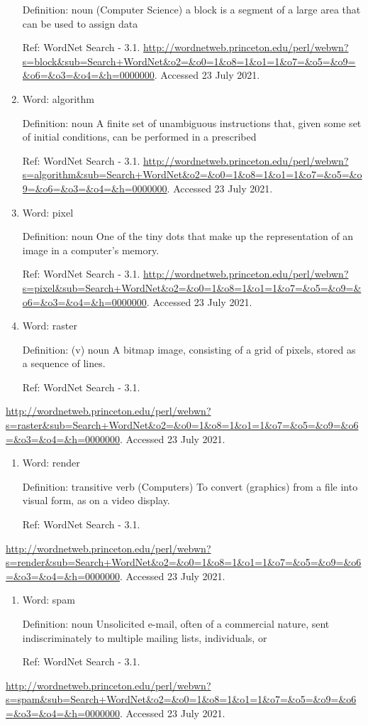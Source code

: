 \documentclass{scrartcl}
\begin{document}
\begin{enumerate}
 Definition: noun (Computer Science) a block is a segment of a large area
that can be used to assign data

Ref: WordNet Search - 3.1. \url{http://wordnetweb.princeton.edu/perl/webwn?s=block\&sub=Search+WordNet\&o2=\&o0=1\&o8=1\&o1=1\&o7=\&o5=\&o9=\&o6=\&o3=\&o4=\&h=0000000}. Accessed 23 July 2021.

\item Word: algorithm

Definition:  noun   A finite set of unambiguous instructions that, given some set of initial conditions, can be performed in a prescribed

Ref: WordNet Search - 3.1. \url{http://wordnetweb.princeton.edu/perl/webwn?s=algorithm\&sub=Search+WordNet\&o2=\&o0=1\&o8=1\&o1=1\&o7=\&o5=\&o9=\&o6=\&o3=\&o4=\&h=0000000}. Accessed 23 July 2021.

\item Word: pixel

Definition:  noun   One of the tiny dots that make up the representation of an image in a computer's memory.

Ref: WordNet Search - 3.1. \url{http://wordnetweb.princeton.edu/perl/webwn?s=pixel\&sub=Search+WordNet\&o2=\&o0=1\&o8=1\&o1=1\&o7=\&o5=\&o9=\&o6=\&o3=\&o4=\&h=0000000}. Accessed 23 July 2021.

\item Word: raster

Definition: (v)  noun  A bitmap image, consisting of a grid of pixels, stored as a sequence of lines.

Ref: WordNet Search - 3.1.
\end{enumerate}
\url{http://wordnetweb.princeton.edu/perl/webwn?s=raster\&sub=Search+WordNet\&o2=\&o0=1\&o8=1\&o1=1\&o7=\&o5=\&o9=\&o6=\&o3=\&o4=\&h=0000000}. Accessed 23 July 2021.

\begin{enumerate}
\item Word: render

Definition: transitive verb (Computers)  To convert (graphics) from a file into visual form, as on a video display.

Ref: WordNet Search - 3.1.
\end{enumerate}
\url{http://wordnetweb.princeton.edu/perl/webwn?s=render\&sub=Search+WordNet\&o2=\&o0=1\&o8=1\&o1=1\&o7=\&o5=\&o9=\&o6=\&o3=\&o4=\&h=0000000}. Accessed 23 July 2021.

\begin{enumerate}
\item Word: spam

Definition:  noun   Unsolicited e-mail, often of a commercial nature, sent indiscriminately to multiple mailing lists, individuals, or

Ref: WordNet Search - 3.1.
\end{enumerate}
\url{http://wordnetweb.princeton.edu/perl/webwn?s=spam\&sub=Search+WordNet\&o2=\&o0=1\&o8=1\&o1=1\&o7=\&o5=\&o9=\&o6=\&o3=\&o4=\&h=0000000}. Accessed 23 July 2021.
\end{document}
